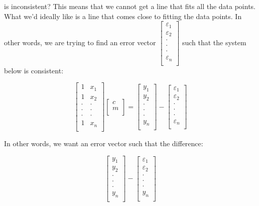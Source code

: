 \documentclass[10pt]{amsart}
\begin{document}
is inconsistent? This means that we cannot get a line that fits all
the data points. What we'd ideally like is a line that comes close to
fitting the data points. In other words, we are trying to find an
error vector $\left[\begin{matrix} \varepsilon_1 \\ \varepsilon_2 \\ \cdot \\ \cdot
    \\ \cdot \\ \varepsilon_n \\\end{matrix}\right]$ such that the system below
is consistent:

$$\left[\begin{matrix} 1 & x_1 \\ 1 & x_2 \\ \cdot & \cdot \\ \cdot & \cdot \\ \cdot & \cdot \\ 1 & x_n \\\end{matrix}\right]\left[\begin{matrix} c \\ m \\\end{matrix}\right] = \left[\begin{matrix} y_1 \\ y_2 \\ \cdot \\ \cdot \\ \cdot \\ y_n \\\end{matrix}\right] - \left[\begin{matrix} \varepsilon_1 \\ \varepsilon_2 \\ \cdot \\ \cdot \\ \cdot \\ \varepsilon_n \\\end{matrix}\right]$$

In other words, we want an error vector such that the difference:

$$\left[\begin{matrix} y_1 \\ y_2 \\ \cdot \\ \cdot \\ \cdot \\ y_n \\\end{matrix}\right] - \left[\begin{matrix} \varepsilon_1 \\ \varepsilon_2 \\ \cdot \\ \cdot \\ \cdot \\ y_n \\\end{matrix}\right]$$
\end{document}
